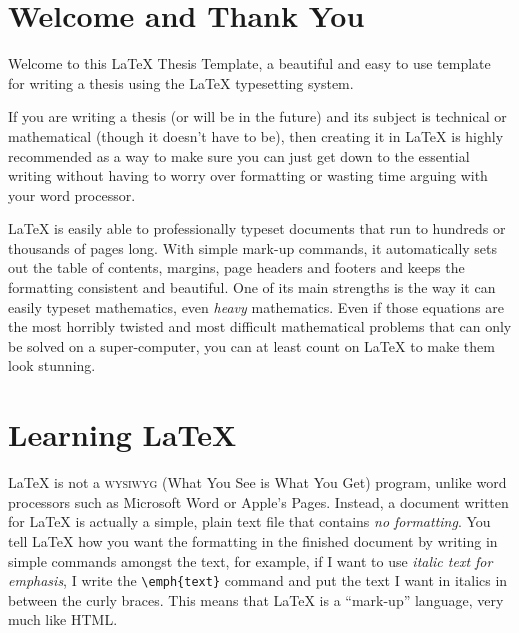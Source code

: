 \documentclass[
12pt, %
english, %
doublespacing, %
nolistspacing, %
liststotoc, %
headsepline, %
chapterinoneline, %
openany, %
]{DoctoralThesis}\usepackage[]{graphicx}\usepackage[]{color}
\begin{document}
\newcommand{\keyword}[1]{\textbf{#1}}
\newcommand{\tabhead}[1]{\textbf{#1}}
\newcommand{\code}[1]{\texttt{#1}}
\newcommand{\file}[1]{\texttt{\bfseries#1}}
\newcommand{\option}[1]{\texttt{\itshape#1}}


\section{Welcome and Thank You}
Welcome to this \LaTeX{} Thesis Template, a beautiful and easy to use template for writing a thesis using the \LaTeX{} typesetting system.

If you are writing a thesis (or will be in the future) and its subject is technical or mathematical (though it doesn't have to be), then creating it in \LaTeX{} is highly recommended as a way to make sure you can just get down to the essential writing without having to worry over formatting or wasting time arguing with your word processor.

\LaTeX{} is easily able to professionally typeset documents that run to hundreds or thousands of pages long. With simple mark-up commands, it automatically sets out the table of contents, margins, page headers and footers and keeps the formatting consistent and beautiful. One of its main strengths is the way it can easily typeset mathematics, even \emph{heavy} mathematics. Even if those equations are the most horribly twisted and most difficult mathematical problems that can only be solved on a super-computer, you can at least count on \LaTeX{} to make them look stunning.


\section{Learning \LaTeX{}}

\LaTeX{} is not a \textsc{wysiwyg} (What You See is What You Get) program, unlike word processors such as Microsoft Word or Apple's Pages. Instead, a document written for \LaTeX{} is actually a simple, plain text file that contains \emph{no formatting}. You tell \LaTeX{} how you want the formatting in the finished document by writing in simple commands amongst the text, for example, if I want to use \emph{italic text for emphasis}, I write the \verb|\emph{text}| command and put the text I want in italics in between the curly braces. This means that \LaTeX{} is a \enquote{mark-up} language, very much like HTML.
\end{document}
